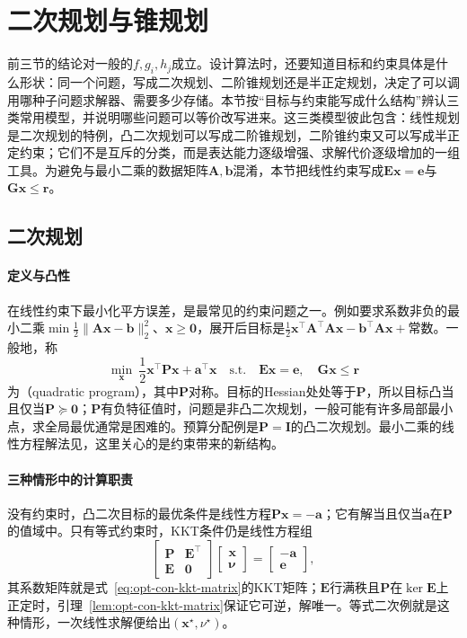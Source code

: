 \section{二次规划与锥规划}
\label{sec:opt-con-quadratic-conic}

前三节的结论对一般的$f,g_i,h_j$成立。设计算法时，还要知道目标和约束具体是什么形状：同一个问题，写成二次规划、二阶锥规划还是半正定规划，决定了可以调用哪种子问题求解器、需要多少存储。本节按“目标与约束能写成什么结构”辨认三类常用模型，并说明哪些问题可以等价改写进来。这三类模型彼此包含：线性规划是二次规划的特例，凸二次规划可以写成二阶锥规划，二阶锥约束又可以写成半正定约束；它们不是互斥的分类，而是表达能力逐级增强、求解代价逐级增加的一组工具。为避免与最小二乘的数据矩阵$\bm A,\bm b$混淆，本节把线性约束写成$\bm E\bm x=\bm e$与$\bm G\bm x\leq\bm r$。

\subsection{二次规划}
\label{sec:opt-con-qp}

\paragraph{定义与凸性}
在线性约束下最小化平方误差，是最常见的约束问题之一。例如要求系数非负的最小二乘$\min\frac12\lVert\bm A\bm x-\bm b\rVert_2^2$、$\bm x\geq\bm0$，展开后目标是$\frac12\bm x^\top\bm A^\top\bm A\bm x-\bm b^\top\bm A\bm x+\text{常数}$。一般地，称
\begin{equation}
\label{eq:opt-con-qp}
  \min_{\bm x}\ \frac12\bm x^\top\bm P\bm x+\bm a^\top\bm x
  \quad\text{s.t.}\quad\bm E\bm x=\bm e,\quad\bm G\bm x\leq\bm r
\end{equation}
为（quadratic program），其中$\bm P$对称。目标的Hessian处处等于$\bm P$，所以目标凸当且仅当$\bm P\succeq\bm0$；$\bm P$有负特征值时，问题是非凸二次规划，一般可能有许多局部最小点，求全局最优通常是困难的。预算分配例是$\bm P=\bm I$的凸二次规划。最小二乘的线性方程解法见，这里关心的是约束带来的新结构。

\paragraph{三种情形中的计算职责}
没有约束时，凸二次目标的最优条件是线性方程$\bm P\bm x=-\bm a$；它有解当且仅当$\bm a$在$\bm P$的值域中。只有等式约束时，KKT条件仍是线性方程组
\[
  \begin{bmatrix}\bm P&\bm E^\top\\\bm E&\bm0\end{bmatrix}
  \begin{bmatrix}\bm x\\\bm\nu\end{bmatrix}
  =\begin{bmatrix}-\bm a\\\bm e\end{bmatrix},
\]
其系数矩阵就是式~\eqref{eq:opt-con-kkt-matrix}的KKT矩阵；$\bm E$行满秩且$\bm P$在$\ker\bm E$上正定时，引理~\ref{lem:opt-con-kkt-matrix}保证它可逆，解唯一。等式二次例就是这种情形，一次线性求解便给出$(\bm x^\star,\nu^\star)$。


